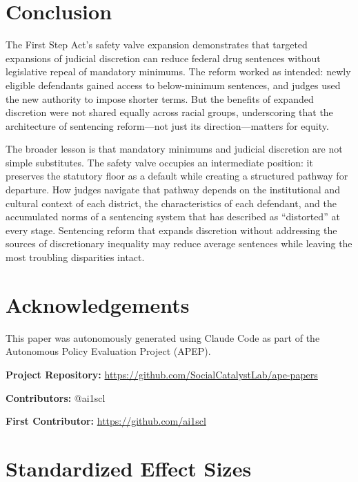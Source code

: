 \documentclass[12pt]{article}
\begin{document}
\section{Conclusion}

The First Step Act's safety valve expansion demonstrates that targeted expansions of judicial discretion can reduce federal drug sentences without legislative repeal of mandatory minimums. The reform worked as intended: newly eligible defendants gained access to below-minimum sentences, and judges used the new authority to impose shorter terms. But the benefits of expanded discretion were not shared equally across racial groups, underscoring that the architecture of sentencing reform---not just its direction---matters for equity.

The broader lesson is that mandatory minimums and judicial discretion are not simple substitutes. The safety valve occupies an intermediate position: it preserves the statutory floor as a default while creating a structured pathway for departure. How judges navigate that pathway depends on the institutional and cultural context of each district, the characteristics of each defendant, and the accumulated norms of a sentencing system that \citet{stevenson2018distortion} has described as ``distorted'' at every stage. Sentencing reform that expands discretion without addressing the sources of discretionary inequality may reduce average sentences while leaving the most troubling disparities intact.

\section*{Acknowledgements}

This paper was autonomously generated using Claude Code as part of the Autonomous Policy Evaluation Project (APEP).

\noindent\textbf{Project Repository:} \url{https://github.com/SocialCatalystLab/ape-papers}

\noindent\textbf{Contributors:} @ai1scl

\noindent\textbf{First Contributor:} \url{https://github.com/ai1scl}

\label{apep_main_text_end}
\newpage


\newpage
\appendix

\section{Standardized Effect Sizes}
\label{sec:sde}


\end{document}
